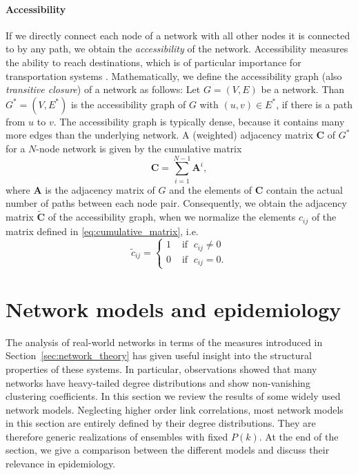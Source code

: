 \paragraph{Accessibility\color{Cayenne}{.}}
If we directly connect each node of a network with all other nodes it is connected to by any path, we obtain the \emph{accessibility} of the network.
Accessibility measures the ability to reach destinations, which is of particular importance for transportation systems \citep{Garrison:1960up,mackewitz}.
Mathematically, we define the accessibility graph (also \emph{transitive closure}) of a network as follows:
Let $G=(V,E)$ be a network.
Than $G^*=(V,E^*)$ is the accessibility graph of $G$ with $(u,v) \in E^*$, if there is a path from $u$ to $v$.
The accessibility graph is typically dense, because it contains many more edges than the underlying network.
A (weighted) adjacency matrix $\mathbf{C}$ of $G^*$ for a $N$-node network is given by the cumulative matrix
\begin{equation}\label{eq:cumulative_matrix}
\mathbf{C}= \sum _{i=1} ^{N-1} \mathbf{A}^i,
\end{equation}
where $\mathbf{A}$ is the adjacency matrix of $G$ and the elements of $\mathbf{C}$ contain the actual number of paths between each node pair.
Consequently, we obtain the adjacency matrix $\tilde{\mathbf{C}}$ of the accessibility graph, when we normalize the elements $c_{ij}$ of the matrix defined in \eqref{eq:cumulative_matrix}, i.e.
\begin{equation}\label{eq:normalize_cumu_matrix}
\tilde{c}_{ij}=%
\begin{cases} 
1 & \text{ if }\; c_{ij}\neq 0 \\
0 &  \text{ if } \; c_{ij}=0 .
\end{cases}
\end{equation}

\section{Network models and epidemiology}\label{sec:network_models}
The analysis of real-world networks in terms of the measures introduced in Section~\ref{sec:network_theory} has given useful insight into the structural properties of these systems.
In particular, observations showed that many networks have heavy-tailed degree distributions and show non-vanishing clustering coefficients.
In this section we review the results of some widely used network models.
Neglecting higher order link correlations, most network models in this section are entirely defined by their degree distributions.
They are therefore generic realizations of ensembles with fixed $P(k)$.
At the end of the section, we give a comparison between the different models and discuss their relevance in epidemiology.

